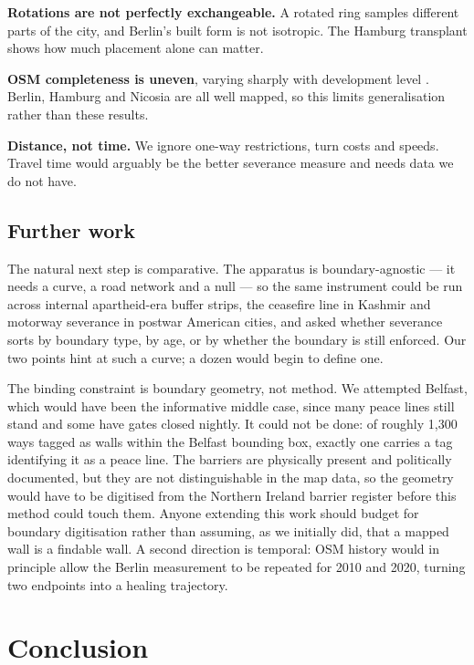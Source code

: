 \documentclass[11pt,a4paper]{article}
\begin{document}
\textbf{Rotations are not perfectly exchangeable.} A rotated ring samples
different parts of the city, and Berlin's built form is not isotropic. The
Hamburg transplant shows how much placement alone can matter.

\textbf{OSM completeness is uneven}, varying sharply with development level
\cite{osm2023}. Berlin, Hamburg and Nicosia are all well mapped, so this limits
generalisation rather than these results.

\textbf{Distance, not time.} We ignore one-way restrictions, turn costs and
speeds. Travel time would arguably be the better severance measure and needs
data we do not have.

\subsection{Further work}

The natural next step is comparative. The apparatus is boundary-agnostic --- it
needs a curve, a road network and a null --- so the same instrument could be run
across internal apartheid-era buffer strips, the ceasefire line in Kashmir and
motorway severance in postwar American cities, and asked whether severance sorts
by boundary type, by age, or by whether the boundary is still enforced. Our two
points hint at such a curve; a dozen would begin to define one.

The binding constraint is boundary geometry, not method. We attempted Belfast,
which would have been the informative middle case, since many peace lines still
stand and some have gates closed nightly. It could not be done: of roughly 1,300
ways tagged as walls within the Belfast bounding box, exactly one carries a tag
identifying it as a peace line. The barriers are physically present and
politically documented, but they are not distinguishable in the map data, so the
geometry would have to be digitised from the Northern Ireland barrier register
before this method could touch them. Anyone extending this work should budget
for boundary digitisation rather than assuming, as we initially did, that a
mapped wall is a findable wall. A second direction is temporal: OSM history would in
principle allow the Berlin measurement to be repeated for 2010 and 2020, turning
two endpoints into a healing trajectory.

\section{Conclusion}
\end{document}
